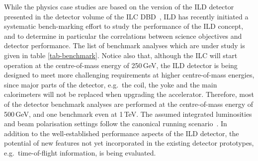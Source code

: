 While the physics case studies are based on the version of the ILD detector presented in the detector volume of the ILC DBD~\cite{Behnke:2013lya}, ILD has recently initiated a systematic bench-marking effort to study the performance of the ILD concept, and to determine in particular the correlations between science objectives and detector performance. The list of benchmark analyses which are under study is given in table \ref{tab-benchmark}. 
Notice also that, although the ILC will start operation at the centre-of-mass energy of 250\,GeV, the ILD detector is being designed to meet more challenging requirements at higher centre-of-mass energies, since major parts of the detector, e.g.\ the coil, the yoke and the main calorimeters will not be replaced when upgrading the accelerator. Therefore, most of the detector benchmark analyses are performed at the centre-of-mass energy of 500\,GeV, and one benchmark even at 1\,TeV. The assumed integrated luminosities and beam polarisation settings follow the canonical running scenario~\cite{Barklow:2015tja}. 
In addition to the well-established performance aspects of the ILD detector, the potential of new features not yet incorporated in the existing detector prototypes, e.g.\ time-of-flight information, is being evaluated.\\

